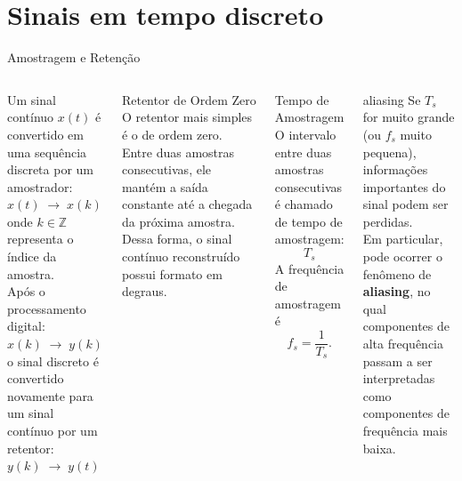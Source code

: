 \section{Sinais em tempo discreto}

\begin{frame}{Amostragem e Retenção}
  \scriptsize
  \begin{columns}[t]
    Um sinal contínuo $x(t)$ é convertido em uma sequência discreta por um amostrador: \\
    $x(t)\;\longrightarrow\;x(k)$ \\
    onde $k\in\mathbb{Z}$ representa o índice da amostra. \\
    Após o processamento digital: \\
    $x(k)\;\longrightarrow\;y(k)$ \\
    o sinal discreto é convertido novamente para um sinal contínuo por um retentor: \\
    $y(k)\;\longrightarrow\;y(t)$
    \begin{block}{Retentor de Ordem Zero}
      O retentor mais simples é o de ordem zero.
      Entre duas amostras consecutivas, ele mantém a saída constante até a chegada da próxima amostra.
      Dessa forma, o sinal contínuo reconstruído possui formato em degraus.
    \end{block}
    \begin{block}{Tempo de Amostragem}
      O intervalo entre duas amostras consecutivas é chamado de tempo de amostragem:
      $$T_s$$
      A frequência de amostragem é
      $$f_s=\frac{1}{T_s}.$$
    \end{block}
    \begin{block}{aliasing}
      Se $T_s$ for muito grande (ou $f_s$ muito pequena), informações importantes do sinal podem ser perdidas. \\
      Em particular, pode ocorrer o fenômeno de \textbf{aliasing}, no qual componentes de alta frequência passam a ser interpretadas como componentes de frequência mais baixa.
    \end{block}
  \end{columns}
\end{frame}

